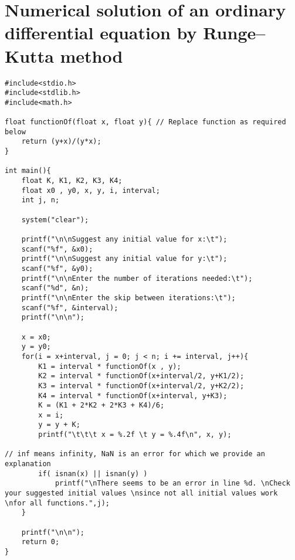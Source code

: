 \documentclass[11pt,oneside]{article}
\begin{document}
\section{Numerical solution of an ordinary differential equation by Runge--Kutta method}
\begin{lstlisting}
#include<stdio.h>
#include<stdlib.h>
#include<math.h>

float functionOf(float x, float y){ // Replace function as required below
    return (y+x)/(y*x);
}

int main(){
    float K, K1, K2, K3, K4;
    float x0 , y0, x, y, i, interval;
    int j, n;
    
    system("clear");
    
    printf("\n\nSuggest any initial value for x:\t");
    scanf("%f", &x0);
    printf("\n\nSuggest any initial value for y:\t");
    scanf("%f", &y0);
    printf("\n\nEnter the number of iterations needed:\t");
    scanf("%d", &n);
    printf("\n\nEnter the skip between iterations:\t");
    scanf("%f", &interval);
    printf("\n\n");
    
    x = x0;
    y = y0;
    for(i = x+interval, j = 0; j < n; i += interval, j++){
        K1 = interval * functionOf(x , y);
        K2 = interval * functionOf(x+interval/2, y+K1/2);
        K3 = interval * functionOf(x+interval/2, y+K2/2);
        K4 = interval * functionOf(x+interval, y+K3);
        K = (K1 + 2*K2 + 2*K3 + K4)/6;
        x = i;
        y = y + K;
        printf("\t\t\t x = %.2f \t y = %.4f\n", x, y);
        
// inf means infinity, NaN is an error for which we provide an explanation
        if( isnan(x) || isnan(y) )
            printf("\nThere seems to be an error in line %d. \nCheck your suggested initial values \nsince not all initial values work \nfor all functions.",j);
    }
    
    printf("\n\n");
    return 0;
}
\end{lstlisting}
\pagebreak
%
%
\end{document}
